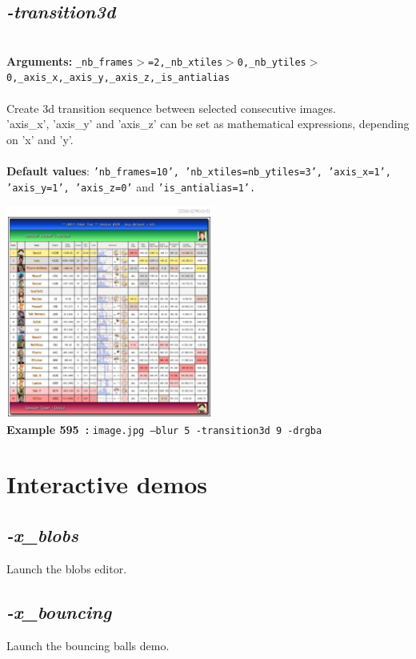 \documentclass[a4paper,11pt,twoside]{book}
\begin{document}
\subsection{\emph{-transition3d} }\vspace*{-0.5em}
~\\\textbf{Arguments: } 
{\small \texttt{\_nb\_frames$>$=2,\_nb\_xtiles$>$0,\_nb\_ytiles$>$0,\_axis\_x,\_axis\_y,\_axis\_z,\_is\_antialias}}\\~\\
Create 3d transition sequence between selected consecutive images.
~\\'axis\_x', 'axis\_y' and 'axis\_z' can be set as mathematical expressions, depending on 'x' and 'y'.
~\\~\\\textbf{Default values}: {\small \texttt{'nb\_frames=10', 'nb\_xtiles=nb\_ytiles=3', 'axis\_x=1', 'axis\_y=1', 'axis\_z=0'} and \texttt{'is\_antialias=1'.}}
\begin{center}\includegraphics[keepaspectratio=true,height=7cm,width=\textwidth]{img/gmic_def595.jpg}\\
{\footnotesize \textbf{Example 595~:} \texttt{image.jpg --blur 5 -transition3d 9 -drgba}}
\end{center}
\section{Interactive demos}


\subsection{\emph{-x\_blobs} }\vspace*{-0.5em}
Launch the blobs editor.


\subsection{\emph{-x\_bouncing} }\vspace*{-0.5em}
Launch the bouncing balls demo.
\end{document}

